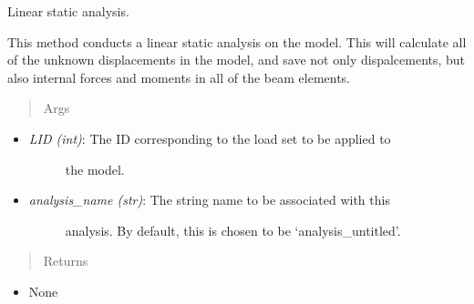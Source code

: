 \documentclass[letterpaper,10pt,english]{sphinxmanual}
\begin{document}
\begin{fulllineitems}
\begin{fulllineitems}
\begin{itemize}
\end{itemize}

\end{fulllineitems}


\begin{fulllineitems}
\label{FEM:AeroComBAT.FEM.Model.staticAnalysis}
Linear static analysis.

This method conducts a linear static analysis on the model. This will
calculate all of the unknown displacements in the model, and save not
only dispalcements, but also internal forces and moments in all of the
beam elements.
\begin{quote}\begin{description}
\item[{Args}] \leavevmode
\end{description}\end{quote}
\begin{itemize}
\item {} \begin{description}
\item[{\emph{LID (int)}: The ID corresponding to the load set to be applied to}] \leavevmode
the model.

\end{description}

\item {} \begin{description}
\item[{\emph{analysis\_name (str)}: The string name to be associated with this}] \leavevmode
analysis. By default, this is chosen to be `analysis\_untitled'.

\end{description}

\end{itemize}
\begin{quote}\begin{description}
\item[{Returns}] \leavevmode
\end{description}\end{quote}
\begin{itemize}
\item {} 
None

\end{itemize}

\end{fulllineitems}


\end{fulllineitems}
\end{document}
